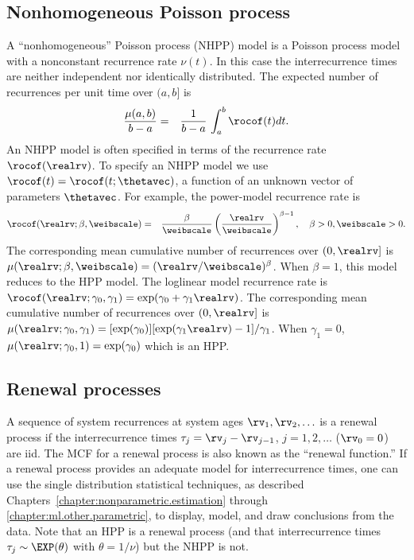 \subsection{Nonhomogeneous Poisson process}
A ``nonhomogeneous'' Poisson process (NHPP) model is a Poisson
process model with a nonconstant recurrence rate $\nu(t)$.  In this
case the interrecurrence times are neither independent nor
identically distributed.  The expected number of recurrences per
unit time over $(a,b]$ is
\begin{eqnarray*}
\frac{
\mu(a, b)
     }
     {
 b-a
     }&=& \frac{1}{b-a} \,
\int_{a}^{b} \rocof(t) dt.
\end{eqnarray*}
An NHPP model is often specified in terms of the recurrence rate
$\rocof(\realrv)$. To specify an NHPP model we use
$\rocof(t)=\rocof(t;\thetavec)$, a function of an unknown vector of
parameters $\thetavec$. For example, the power-model recurrence rate is
\begin{eqnarray*}
\rocof(\realrv;\beta, \weibscale)&=&  \frac{\beta}
		         {\weibscale}
       \left (
	 \frac{\realrv}
	      {\weibscale}  
       \right )^{\beta-1}, \quad \beta>0, \weibscale>0.
\end{eqnarray*}
The corresponding mean cumulative number of 
recurrences over $(0,\realrv]$ is 
$\mu(\realrv;\beta, \weibscale)= (\realrv/\weibscale )^{\beta}$.
When $\beta=1$, this model reduces to the HPP model.
The loglinear model recurrence rate is
$\rocof(\realrv;\gamma_{0},\gamma_{1})=\exp(\gamma_{0}+\gamma_{1} \realrv)$.
The corresponding mean cumulative number of
recurrences over $(0, \realrv]$ is
$\mu(\realrv;\gamma_{0},\gamma_{1})=
[\exp(\gamma_{0})]  [\exp(\gamma_{1} \realrv)-1 ]/\gamma_{1}$.
When $\gamma_{1}=0$, $\mu(\realrv;\gamma_{0},1)=\exp(\gamma_{0})$
which is an HPP.
\subsection{Renewal processes}
A sequence of system recurrences at system ages $\rv_{1}, \rv_{2},
\ldots$ is a renewal process if the interrecurrence times
$\tau_{j}=
\rv_{j}-\rv_{j-1}$, $j=1,2,\ldots$ ($\rv_{0}=0$) are iid.  
The MCF for a renewal
process is also known as the ``renewal function.''  If a renewal
process provides an adequate model for interrecurrence times, one
can use the single distribution statistical techniques, as described
Chapters~\ref{chapter:nonparametric.estimation} through
\ref{chapter:ml.other.parametric}, to display, model, and draw conclusions
from the data. Note that an HPP is a renewal process (and that
interrecurrence times $\tau_{j} \sim \EXP(\theta)$ with
$\theta=1/\nu$) but the NHPP is not.

